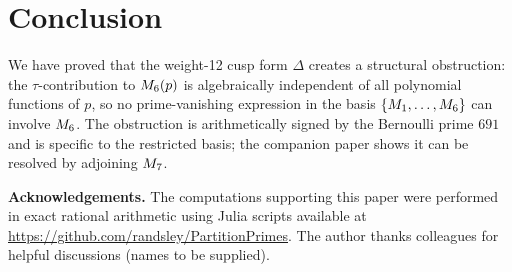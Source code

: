 \documentclass[11pt]{article}
\begin{document}
\section{Conclusion}
\label{sec:conclusion}

We have proved that the weight-12 cusp form $\Delta$ creates a structural obstruction:
the $\tau$-contribution to $M_{6}(p)$ is algebraically independent of all polynomial
functions of $p$, so no prime-vanishing expression in the basis
$\{M_{1},\dots,M_{6}\}$ can involve $M_{6}$.
The obstruction is arithmetically signed by the Bernoulli prime $691$ and is specific
to the restricted basis; the companion paper \cite{Randsley2025c} shows it can be
resolved by adjoining $M_{7}$.

\medskip
\noindent\textbf{Acknowledgements.}
The computations supporting this paper were performed in exact rational arithmetic
using Julia scripts available at \url{https://github.com/randsley/PartitionPrimes}.
The author thanks colleagues for helpful discussions (names to be supplied).
\end{document}
